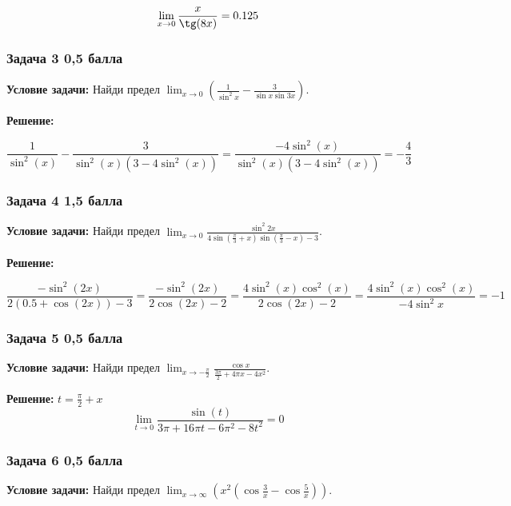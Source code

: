 \documentclass[a4paper,12pt]{article}
\begin{document}
\[
\lim_{x \to 0} \frac{x}{\tg(8x)} = 0.125
\]

\vspace{1cm}

\subsubsection{Задача 3 \hfill 0,5 балла}
\textbf{Условие задачи:} Найди предел \( \lim_{x \to 0} \left( \frac{1}{\sin^2 x} - \frac{3}{\sin x \sin 3x} \right) \).

\textbf{Решение: } 

\[
\frac{1}{\sin^2(x)} - \frac{3}{\sin^2(x)(3 -4\sin^2(x))} = \frac{-4\sin^2(x)}{\sin^2(x)(3 -4\sin^2(x))} = -\frac{4}{3}
\]

\vspace{1cm}

\subsubsection{Задача 4 \hfill 1,5 балла}
\textbf{Условие задачи:} Найди предел \( \lim_{x \to 0} \frac{\sin^2 2x}{4 \sin \left( \frac{\pi}{3} + x \right) \sin \left( \frac{\pi}{3} - x \right)-3} \).

\textbf{Решение: }

\[
\frac{-\sin^2(2x)}{2(0.5 + \cos(2x)) - 3} = \frac{-\sin^2(2x)}{2\cos(2x)-2} = \frac{4\sin^2(x)\cos^2(x)}{2\cos(2x)-2} = \frac{4\sin^2(x)\cos^2(x)}{-4\sin^2x} = -1
\]

\vspace{1cm}

\subsubsection{Задача 5 \hfill 0,5 балла}
\textbf{Условие задачи:} Найди предел \( \lim_{x \to -\frac{\pi}{2}} \frac{\cos x}{\frac{3\pi}{2} + 4\pi x - 4x^2} \).

\textbf{Решение: } 
$t=\frac{\pi}{2} + x$
\[
\lim_{t \to 0}\frac{\sin(t)}{3\pi + 16\pi t - 6\pi^2 - 8t^2} = 0
\]

\vspace{1cm}

\subsubsection{Задача 6 \hfill 0,5 балла}
\textbf{Условие задачи:} Найди предел \( \lim_{x \to \infty} \left( x^2 (\cos\frac{3}{x} - \cos\frac{5}{x}) \right) \).
\end{document}
